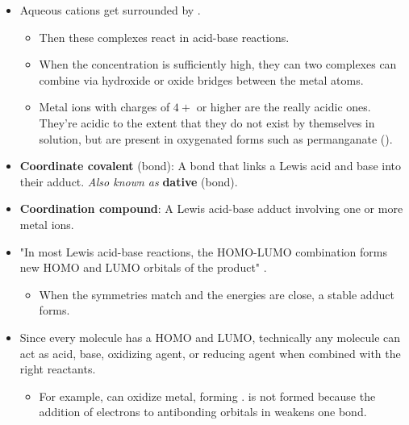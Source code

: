 \documentclass[../notes.tex]{subfiles}
\begin{document}
\begin{itemize}
    \item Aqueous cations get surrounded by .
    \begin{itemize}
        \item Then these complexes react in acid-base reactions.
        \item When the concentration is sufficiently high, they can two complexes can combine via hydroxide or oxide bridges between the metal atoms.
        \item Metal ions with charges of $4+$ or higher are the really acidic ones. They're acidic to the extent that they do not exist by themselves in solution, but are present in oxygenated forms such as permanganate ().
    \end{itemize}
    \item \textbf{Coordinate covalent} (bond): A bond that links a Lewis acid and base into their adduct. \emph{Also known as} \textbf{dative} (bond).
    \item \textbf{Coordination compound}: A Lewis acid-base adduct involving one or more metal ions.
    \item "In most Lewis acid-base reactions, the HOMO-LUMO combination forms new HOMO and LUMO orbitals of the product" \parencite[186]{bib:MiesslerFischerTarr}.
    \begin{itemize}
        \item When the symmetries match and the energies are close, a stable adduct forms.
    \end{itemize}
    \item Since every molecule has a HOMO and LUMO, technically any molecule can act as acid, base, oxidizing agent, or reducing agent when combined with the right reactants.
    \begin{itemize}
        \item For example,  can oxidize  metal, forming .  is not formed because the addition of electrons to antibonding orbitals in  weakens one  bond.
    \end{itemize}
\end{itemize}
\end{document}
